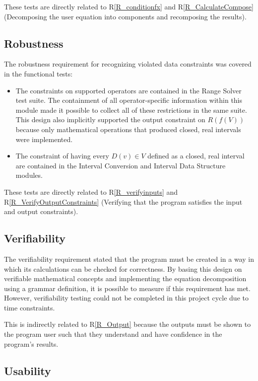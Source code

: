 \documentclass[12pt, titlepage]{article}
\newcommand{\rref}[1]{R\ref{#1}}
\begin{document}
These tests are directly related to \rref{R_conditionfx} and 
\rref{R_CalculateCompose} (Decomposing the user equation into components and 
recomposing the results).

\subsection{Robustness}
The robustness requirement for recognizing violated data constraints was 
covered in the functional tests:

\begin{itemize}
	\item The constraints on supported operators are contained in the Range 
	Solver test suite. The containment of all operator-specific information 
	within this module made it possible to collect all of these restrictions in 
	the same suite. This design also implicitly supported the output constraint 
	on $R(f(V))$ because only mathematical operations that produced closed, 
	real intervals were implemented.
	\item The constraint of having every $D(v) \in V$ defined as a closed, real 
	interval are contained in the Interval Conversion and Interval Data 
	Structure modules.
\end{itemize}

These tests are directly related to \rref{R_verifyinputs} and 
\rref{R_VerifyOutputConstraints} (Verifying that the program satisfies the 
input and output constraints).

\subsection{Verifiability}
The verifiability requirement stated that the program must be created in a way 
in which its calculations can be checked for correctness. By basing this design 
on verifiable mathematical concepts and implementing the equation decomposition 
using a grammar definition, it is possible to measure if this requirement has 
met. However, verifiability testing could not be completed in this project 
cycle due to time constraints.

This is indirectly related to \rref{R_Output} because the outputs must be shown 
to the program user such that they understand and have confidence in the 
program's results.

\subsection{Usability}
		
\end{document}
